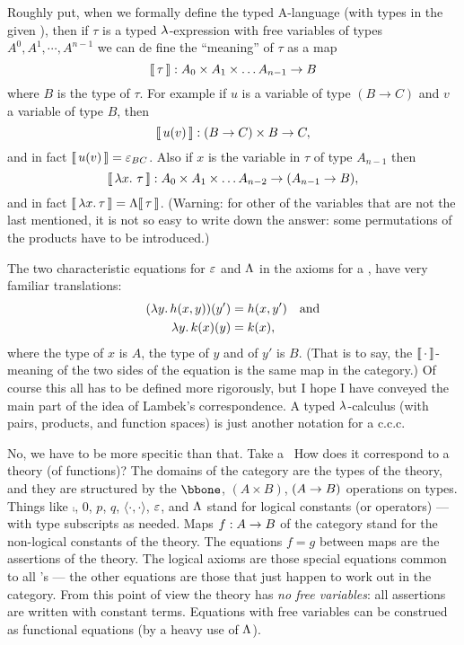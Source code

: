 Roughly put, when we formally define the typed A-language (with types in the given \ccc), then if $\tau$ is a typed $\lambda$-expression with free variables of types $A^0, A^1,\cdots, A^{n-1}$ we can de fine the ``meaning'' of $\tau$ as a map
%
$$
\llbracket\, \tau \,\rrbracket: A_0 \times A_1 \times \dots A_{n-1} \rightarrow B
$$
%
where $B$ is the type of $\tau$. For example if $u$ is a variable of type $(B \to C)$ and $v$ a variable of type $B$, then
$$
\llbracket\, u(v) \,\rrbracket: (B \rightarrow C) \times B \rightarrow C,
$$
%
and in fact $\llbracket\, u(v) \,\rrbracket = \varepsilon_{BC}$. Also if $x$ is the variable in $\tau$ of type $A_{n-1}$ then
$$
\means{\lm{x}.\, \tau}: A_0 \times A_1 \times \dots A_{n-2} \to (A_{n-1} \to B),
$$
%
and in fact $\llbracket\, \lambda x.\, \tau \,\rrbracket = \Lambda\llbracket\, \tau \,\rrbracket$. (Warning: for other of the variables that are not the last mentioned, it is not so easy to write down the answer: some permutations of the products have to be introduced.)

The two characteristic equations for $\varepsilon$ and $\Lambda$ in the axioms for a \ccc, have very familiar translations:
\begin{align*}
( \lm{y}. h(x,y))(y') &= h(x,y') \quad {\textrm {and}} \\
\lm{y}. k(x)(y) &= k(x),
\end{align*}
%
where the type of $x$ is $A$, the type of $y$ and of $y'$ is $B$. (That is to say, the $\llbracket\, \cdot \,\rrbracket$-meaning of the two sides of the equation is
the same map in the category.) Of course this all has to be defined more rigorously, but I hope I have conveyed the main part of the idea of Lambek's correspondence. A typed $\lambda$-calculus (with pairs, products, and function spaces) is just another notation for a {c.c.c}.

No, we have to be more specitic than that. Take a \ccc\ How does it correspond to a theory (of functions)? The domains
of the category are the types of the theory, and they are structured by the $\bbone$, $(A \times B)$, $(A \rightarrow B)$ operations on types. Things like $\comp$,
$0$, $p$, $q$, $\langle\cdot,\cdot\rangle$, $\varepsilon$, and $\Lambda$ stand for logical constants (or operators) --- with type subscripts as needed. Maps $f : A \rightarrow B$ of the category stand for the non-logical constants of the theory.
The equations $f = g$ between maps are the assertions of the theory. The logical axioms are those special equations common to all \ccc's --- the other equations are those that just happen to work out in the category. From this point of view the theory has {\it no free variables}: all assertions are written with constant terms. Equations with free variables can be construed as functional equations (by a heavy use of $\Lambda$).

